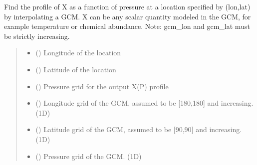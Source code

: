 \documentclass[letterpaper,10pt,english]{sphinxmanual}
\begin{document}

\begin{fulllineitems}
\label{\detokenize{api:nemesispy.interp_gcm_X}}
\pysigstartsignatures
{}
\pysigstopsignatures
\sphinxAtStartPar
Find the profile of X as a function of pressure at a location specified by
(lon,lat) by interpolating a GCM. X can be any scalar quantity modeled in
the GCM, for example temperature or chemical abundance.
Note: gcm\_lon and gcm\_lat must be strictly increasing.
\begin{quote}\begin{description}
\begin{itemize}
\item {} 
\sphinxAtStartPar
{} () \textendash{} Longitude of the location

\item {} 
\sphinxAtStartPar
{} () \textendash{} Latitude of the location

\item {} 
\sphinxAtStartPar
{} () \textendash{} Pressure grid for the output X(P) profile

\item {} 
\sphinxAtStartPar
{} () \textendash{} Longitude grid of the GCM, assumed to be {[}\sphinxhyphen{}180,180{]} and increasing. (1D)

\item {} 
\sphinxAtStartPar
{} () \textendash{} Latitude grid of the GCM, assumed to be {[}\sphinxhyphen{}90,90{]} and increasing. (1D)

\item {} 
\sphinxAtStartPar
{} () \textendash{} Pressure grid of the GCM. (1D)


\end{itemize}
\end{description}
\end{quote}
\end{fulllineitems}
\end{document}
